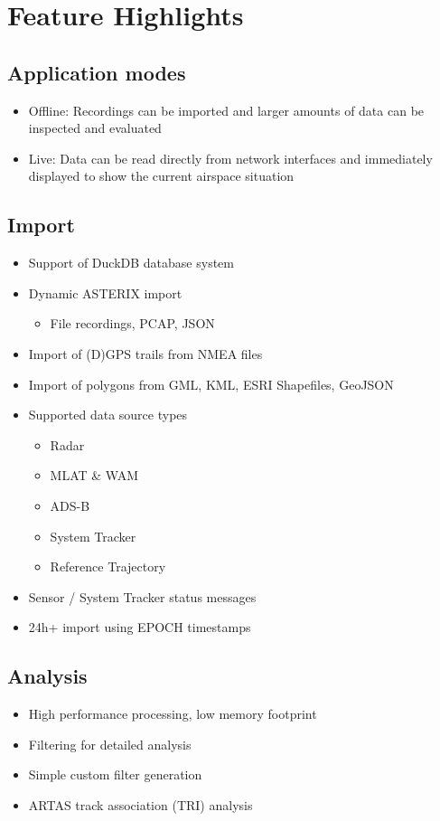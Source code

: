 \section{Feature Highlights}

\subsection{Application modes}
\begin{itemize} 
    \item Offline: Recordings can be imported and larger amounts of data can be inspected and evaluated
    \item Live: Data can be read directly from network interfaces and immediately displayed to show the current airspace situation
\end{itemize}

\subsection{Import}
\begin{itemize}  
    \item Support of DuckDB database system
    \item Dynamic ASTERIX import
    \begin{itemize}  
        \item File recordings, PCAP, JSON
    \end{itemize}    
    \item Import of (D)GPS trails from NMEA files
    \item Import of polygons from GML, KML, ESRI Shapefiles, GeoJSON
    \item Supported data source types
    \begin{itemize}  
        \item Radar
        \item MLAT \& WAM
        \item ADS-B
        \item System Tracker
        \item Reference Trajectory
    \end{itemize}
    \item Sensor / System Tracker status messages
    \item 24h+ import using EPOCH timestamps    
\end{itemize}

\subsection{Analysis}
\begin{itemize}  
    \item High performance processing, low memory footprint
    \item Filtering for detailed analysis
    \item Simple custom filter generation
    \item ARTAS track association (TRI) analysis
\end{itemize}

